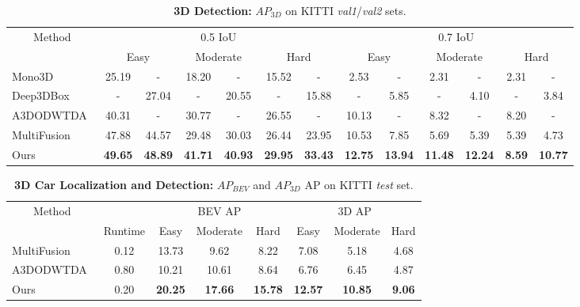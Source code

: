 \documentclass[10pt,twocolumn,letterpaper]{article}
\begin{document}
	\begin{table*}[t!]
		\small
		\centering
		\begin{tabular}{|l||c@{~/~}cc@{~/~}cc@{~/~}c||c@{~/~}cc@{~/~}cc@{~/~}c|}
			\hline
			\multicolumn{1}{|c||}{Method} & \multicolumn{6}{c||}{0.5 IoU} & \multicolumn{6}{c|}{0.7 IoU} \\
			\cline{2-13} &
			\multicolumn{2}{c}{Easy} & \multicolumn{2}{c}{Moderate} & \multicolumn{2}{c||}{Hard} &
			\multicolumn{2}{c}{Easy} & \multicolumn{2}{c}{Moderate} & \multicolumn{2}{c|}{Hard} \\ \hline
			Mono3D~\cite{chen_mono3d}   & 25.19 &   -   & 18.20 &   -   & 15.52 &   -   &  2.53 &   -   &  2.31 &   -   &  2.31 &   -   \\
			Deep3DBox~\cite{mousavian_deep3dbox} &   -   & 27.04 &   -   & 20.55 &   -   & 15.88 &    -  &  5.85 &   -   &  4.10 &   -   &  3.84 \\ 
			A3DODWTDA~\cite{lindernoren}        & 40.31 &   -   & 30.77 &   -   & 26.55 &   -   & 10.13 &   -   &  8.32 &   -   &  8.20 &   -   \\
			MultiFusion~\cite{xu_multifusion}  & 47.88 & 44.57 & 29.48 & 30.03 & 26.44 & 23.95 & 10.53 &  7.85 &  5.69 &  5.39 &  5.39 &  4.73 \\ \hline
			Ours      & \textbf{49.65} &   \textbf{48.89}   & \textbf{41.71} &   \textbf{40.93}   & \textbf{29.95} & \textbf{33.43}   &  
			\textbf{12.75} &   \textbf{13.94}   & \textbf{11.48} &   \textbf{12.24}   & \textbf{8.59} &   \textbf{10.77} \\
			\hline
		\end{tabular}
		\caption{\textbf{3D Detection:} \emph{$AP_{3D}$} on KITTI \emph{val1}/\emph{val2} sets.}
		\label{tab:kitti_val_3d}
	\end{table*}
	
	\begin{table*}[t!]
		\small
		\centering
		\begin{tabular}{|l||c|ccc||ccc|}
			\hline
			\multicolumn{1}{|c||}{Method} & & \multicolumn{3}{c||}{BEV AP} & \multicolumn{3}{c|}{3D AP} \\
			\cline{3-8}               & Runtime &  Easy & Moderate &  Hard &  Easy & Moderate &  Hard \\ \hline
			MultiFusion~\cite{xu_multifusion} & 0.12 & 13.73 &     9.62 &  8.22 &  7.08 &     5.18 &  4.68 \\
			A3DODWTDA~\cite{lindernoren} & 0.80 & 10.21 &    10.61 &  8.64 &  6.76 &     6.45 &  4.87 \\ \hline
			Ours                         & 0.20 & \textbf{20.25} & \textbf{17.66} & \textbf{15.78} &
			\textbf{12.57} & \textbf{10.85} & \textbf{ 9.06} \\ \hline
		\end{tabular}
		\caption{\textbf{3D Car Localization and Detection:} \emph{$AP_{BEV}$} and \emph{$AP_{3D}$} AP on KITTI \emph{test} set.}
		\label{tab:kitti_test}
	\end{table*}
	
\end{document}
